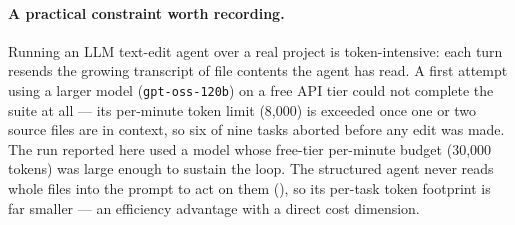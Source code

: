 \paragraph{A practical constraint worth recording.} Running an LLM text-edit agent
over a real project is token-intensive: each turn resends the growing transcript of
file contents the agent has read. A first attempt using a larger model
(\texttt{gpt-oss-120b}) on a free API tier could not complete the suite at all ---
its per-minute token limit (8{,}000) is exceeded once one or two source files are
in context, so six of nine tasks aborted before any edit was made. The run reported
here used a model whose free-tier per-minute budget (30{,}000 tokens) was large
enough to sustain the loop. The structured agent never reads whole files into the
prompt to act on them (), so its per-task token footprint is
far smaller --- an efficiency advantage with a direct cost dimension.

